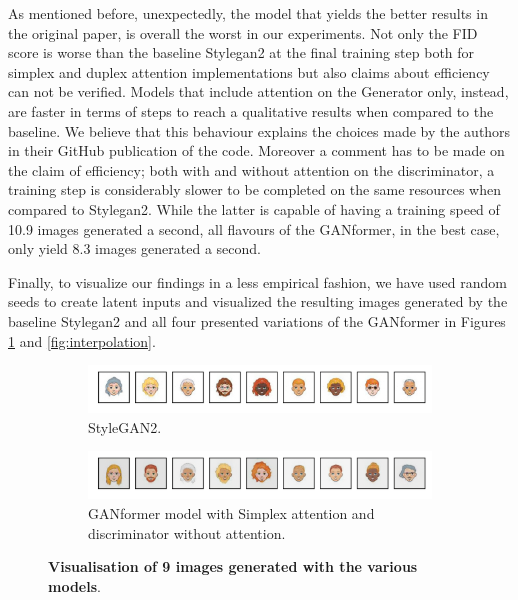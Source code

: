 \documentclass{article}
\begin{document}
	
	As mentioned before, unexpectedly, the model that yields the better results in the original paper, is overall the worst in our experiments.
	Not only the FID score is worse than the baseline Stylegan2 at the final training step both for simplex and duplex attention implementations but also claims about efficiency can not be verified.
	Models that include attention on the Generator only, instead, are faster in terms of steps to reach a qualitative results when compared to the baseline.
	We believe that this behaviour explains the choices made by the authors in their GitHub publication of the code.
	Moreover a comment has to be made on the claim of efficiency; both with and without attention on the discriminator, a training step is considerably slower to be completed on the same resources when compared to Stylegan2.
	While the latter is capable of having a training speed of 10.9 images generated a second, all flavours of the GANformer, in the best case, only yield 8.3 images generated a second.
	
	Finally, to visualize our findings in a less empirical fashion, we have used random 
	seeds to create latent inputs and visualized the resulting images generated by the baseline 
	Stylegan2 and all four presented variations of the GANformer in Figures \ref{fig:random} and 
	\ref{fig:interpolation}.
	\begin{figure}[htpb]
		\centering
		\begin{subfigure}{\linewidth}
			\includegraphics[width=\linewidth]{../src/trained_network/out_imgs/random_Stylegan2_300kimg.png}
			\vspace{-7mm}
			\caption{StyleGAN2.} 
		\end{subfigure}
		\begin{subfigure}{\linewidth}
			\includegraphics[width=\linewidth]{../src/trained_network/out_imgs/random_GANFormer_Simplex_D_StyleGAN_300kimg.png}
			\vspace{-7mm}
			\caption{GANformer model with Simplex attention and discriminator without attention.}
		\end{subfigure}
		\vspace{3mm}
		\caption{\textbf{Visualisation of 9 images generated with the various models}.}\label{fig:random}
	\end{figure}
\end{document}
